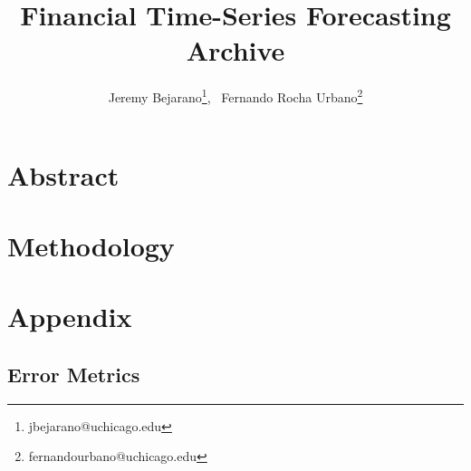\documentclass{article}
\title{Financial Time-Series Forecasting Archive}
\author{Jeremy Bejarano\footnote{jbejarano@uchicago.edu}, \ Fernando Rocha Urbano\footnote{fernandourbano@uchicago.edu}}
\numberwithin{equation}{section}
\begin{document}
\begin{titlepage}
    \vfill
    \maketitle
    \vfill
\end{titlepage}

\section{Abstract}

\section{Methodology}



\newpage

\section{Appendix}

\subsection{Error Metrics}
\label{sec:error_metrics}


\end{document}
